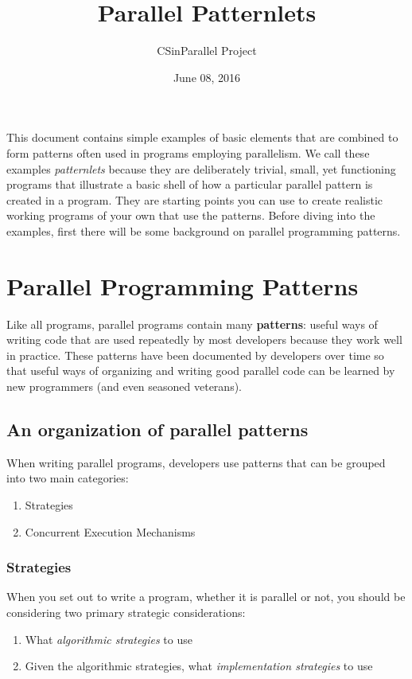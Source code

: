 \documentclass[letterpaper,10pt,openany,oneside]{sphinxmanual}
\title{Parallel Patternlets}
\date{June 08, 2016}
\author{CSinParallel Project}
\begin{document}
\maketitle
\tableofcontents
{}\label{index::doc}


This document contains simple examples of basic elements that are combined to form patterns often used in programs employing parallelism.  We call these examples \emph{patternlets} because they are deliberately trivial, small, yet functioning programs that illustrate a basic shell of how a particular parallel pattern is created in a program.  They are starting points you can use to create realistic working programs of your own that use the patterns.  Before diving into the examples, first there will be some background on parallel programming patterns.


\chapter{Parallel Programming Patterns}
\label{PatternsIntro:parallel-programming-patterns}\label{PatternsIntro::doc}\label{PatternsIntro:parallel-patternlets}
Like all programs, parallel programs contain many \textbf{patterns}: useful ways of writing code that are used repeatedly by most developers because they work well in practice.  These patterns have been documented by developers over time so that useful ways of organizing and writing good parallel code can be learned by new programmers (and even seasoned veterans).


\section{An organization of parallel patterns}
\label{PatternsIntro:an-organization-of-parallel-patterns}
When writing parallel programs, developers use patterns that can be grouped into two main categories:
\begin{enumerate}
\item {} 
Strategies

\item {} 
Concurrent Execution Mechanisms

\end{enumerate}


\subsection{Strategies}
\label{PatternsIntro:strategies}
When you set out to write a program, whether it is parallel or not, you should be considering two primary strategic considerations:
\begin{enumerate}
\item {} 
What \emph{algorithmic strategies} to use

\item {} 
Given the algorithmic strategies, what \emph{implementation strategies} to use

\end{enumerate}
\end{document}
